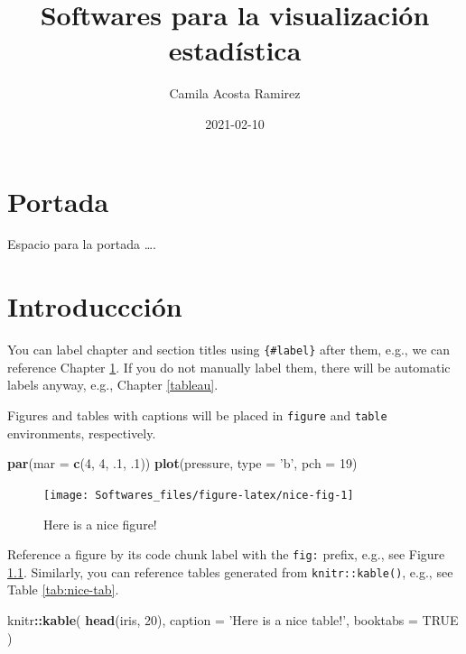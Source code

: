\documentclass[
]{book}
\title{Softwares para la visualización estadística}
\author{Camila Acosta Ramirez}
\date{2021-02-10}
\newenvironment{Shaded}{\begin{snugshade}}{\end{snugshade}}
\newcommand{\DataTypeTok}[1]{\textcolor[rgb]{0.13,0.29,0.53}{#1}}
\newcommand{\DecValTok}[1]{\textcolor[rgb]{0.00,0.00,0.81}{#1}}
\newcommand{\FloatTok}[1]{\textcolor[rgb]{0.00,0.00,0.81}{#1}}
\newcommand{\KeywordTok}[1]{\textcolor[rgb]{0.13,0.29,0.53}{\textbf{#1}}}
\newcommand{\NormalTok}[1]{#1}
\newcommand{\OperatorTok}[1]{\textcolor[rgb]{0.81,0.36,0.00}{\textbf{#1}}}
\newcommand{\OtherTok}[1]{\textcolor[rgb]{0.56,0.35,0.01}{#1}}
\newcommand{\StringTok}[1]{\textcolor[rgb]{0.31,0.60,0.02}{#1}}
\begin{document}
\maketitle

{
\setcounter{tocdepth}{1}
\tableofcontents
}
\hypertarget{portada}{%
\chapter*{Portada}\label{portada}}

Espacio para la portada \ldots.

\hypertarget{intro}{%
\chapter{Introduccción}\label{intro}}

You can label chapter and section titles using \texttt{\{\#label\}} after them, e.g., we can reference Chapter \ref{intro}. If you do not manually label them, there will be automatic labels anyway, e.g., Chapter \ref{tableau}.

Figures and tables with captions will be placed in \texttt{figure} and \texttt{table} environments, respectively.

\begin{Shaded}
\begin{Highlighting}[]
\KeywordTok{par}\NormalTok{(}\DataTypeTok{mar =} \KeywordTok{c}\NormalTok{(}\DecValTok{4}\NormalTok{, }\DecValTok{4}\NormalTok{, }\FloatTok{.1}\NormalTok{, }\FloatTok{.1}\NormalTok{))}
\KeywordTok{plot}\NormalTok{(pressure, }\DataTypeTok{type =} \StringTok{'b'}\NormalTok{, }\DataTypeTok{pch =} \DecValTok{19}\NormalTok{)}
\end{Highlighting}
\end{Shaded}

\begin{figure}

{\centering \texttt{[image: Softwares\_files/figure-latex/nice-fig-1]} 

}

\caption{Here is a nice figure!}\label{fig:nice-fig}
\end{figure}

Reference a figure by its code chunk label with the \texttt{fig:} prefix, e.g., see Figure \ref{fig:nice-fig}. Similarly, you can reference tables generated from \texttt{knitr::kable()}, e.g., see Table \ref{tab:nice-tab}.

\begin{Shaded}
\begin{Highlighting}[]
\NormalTok{knitr}\OperatorTok{::}\KeywordTok{kable}\NormalTok{(}
  \KeywordTok{head}\NormalTok{(iris, }\DecValTok{20}\NormalTok{), }\DataTypeTok{caption =} \StringTok{'Here is a nice table!'}\NormalTok{,}
  \DataTypeTok{booktabs =} \OtherTok{TRUE}
\NormalTok{)}
\end{Highlighting}
\end{Shaded}
\end{document}
